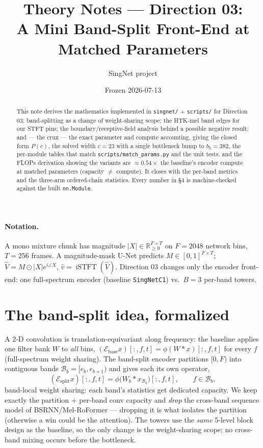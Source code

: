 \documentclass[11pt]{article}
\title{Theory Notes --- Direction 03:\\ A Mini Band-Split Front-End at Matched
Parameters}
\author{SingNet project}
\date{Frozen 2026-07-13}
\newcommand{\code}[1]{\texttt{#1}}
\newcommand{\iSTFT}{\operatorname{iSTFT}}
\begin{document}
\maketitle

\begin{abstract}
This note derives the mathematics implemented in \code{singnet/} +
\code{scripts/} for Direction 03: band-splitting as a change of weight-sharing
scope; the HTK-mel band edges for our STFT pins; the boundary/receptive-field
analysis behind a possible negative result; and --- the crux --- the exact
parameter and compute accounting, giving the closed form $P(c)$, the solved width
$c=23$ with a single bottleneck bump to $b_5=382$, the per-module tables that
match \code{scripts/match\_params.py} and the unit tests, and the FLOPs derivation
showing the variants are $\approx\!0.54\times$ the baseline's encoder compute at
matched parameters (capacity $\ne$ compute). It closes with the per-band metrics
and the three-arm ordered-chain statistics. Every number in \S4 is machine-checked
against the built \code{nn.Module}.
\end{abstract}

\paragraph{Notation.} A mono mixture chunk has magnitude $|X|\in\mathbb
R_{\ge0}^{F\times T}$ on $F=2048$ network bins, $T=256$ frames. A magnitude-mask
U-Net predicts $M\in[0,1]^{F\times T}$; $\widehat V=M\odot|X|e^{i\angle X}$,
$\hat v=\iSTFT(\widehat V)$. Direction 03 changes only the encoder front-end: one
full-spectrum encoder (baseline \code{SingNetC1}) vs.\ $B=3$ per-band towers.

\section{The band-split idea, formalized}

A 2-D convolution is translation-equivariant along frequency: the baseline applies
one filter bank $W$ to \emph{all} bins,
$(\mathcal E_{\text{base}}x)[:,f,t]=\phi(W*x)[:,f,t]$ for every $f$
(full-spectrum weight sharing). The band-split encoder partitions $[0,F)$ into
contiguous bands $\mathcal B_b=[e_b,e_{b+1})$ and gives each its own operator,
\[
(\mathcal E_{\text{split}}x)[:,f,t]=\phi\big(W_b*x_{\mathcal B_b}\big)[:,f,t],
\qquad f\in\mathcal B_b,
\]
band-local weight sharing: each band's statistics get dedicated capacity. We keep
exactly the partition + per-band conv capacity and \emph{drop} the cross-band
sequence model of BSRNN/Mel-RoFormer --- dropping it is what isolates the
partition (otherwise a win could be the attention). The towers use the
\emph{same} 5-level block design as the baseline, so the only change is the
weight-sharing scope; no cross-band mixing occurs before the bottleneck.
\end{document}
